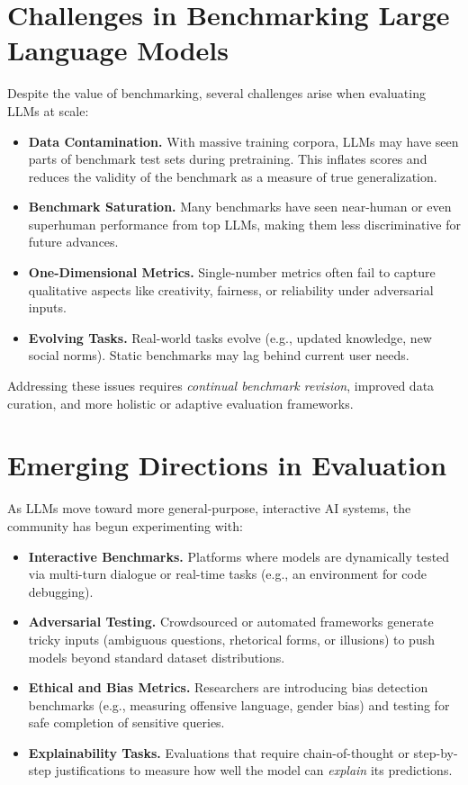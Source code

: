 \section{Challenges in Benchmarking Large Language Models}
\noindent
Despite the value of benchmarking, several challenges arise when evaluating LLMs at scale:
\begin{itemize}
    \item \textbf{Data Contamination.} With massive training corpora, LLMs may have seen parts of benchmark test sets during pretraining. This inflates scores and reduces the validity of the benchmark as a measure of true generalization.
    \item \textbf{Benchmark Saturation.} Many benchmarks have seen near-human or even superhuman performance from top LLMs, making them less discriminative for future advances.
    \item \textbf{One-Dimensional Metrics.} Single-number metrics often fail to capture qualitative aspects like creativity, fairness, or reliability under adversarial inputs.
    \item \textbf{Evolving Tasks.} Real-world tasks evolve (e.g., updated knowledge, new social norms). Static benchmarks may lag behind current user needs.
\end{itemize}

\noindent
Addressing these issues requires \emph{continual benchmark revision}, improved data curation, and more holistic or adaptive evaluation frameworks.

\section{Emerging Directions in Evaluation}
\noindent
As LLMs move toward more general-purpose, interactive AI systems, the community has begun experimenting with:
\begin{itemize}
    \item \textbf{Interactive Benchmarks.} Platforms where models are dynamically tested via multi-turn dialogue or real-time tasks (e.g., an environment for code debugging).
    \item \textbf{Adversarial Testing.} Crowdsourced or automated frameworks generate tricky inputs (ambiguous questions, rhetorical forms, or illusions) to push models beyond standard dataset distributions.
    \item \textbf{Ethical and Bias Metrics.} Researchers are introducing bias detection benchmarks (e.g., measuring offensive language, gender bias) and testing for safe completion of sensitive queries.
    \item \textbf{Explainability Tasks.} Evaluations that require chain-of-thought or step-by-step justifications to measure how well the model can \emph{explain} its predictions.
\end{itemize}

